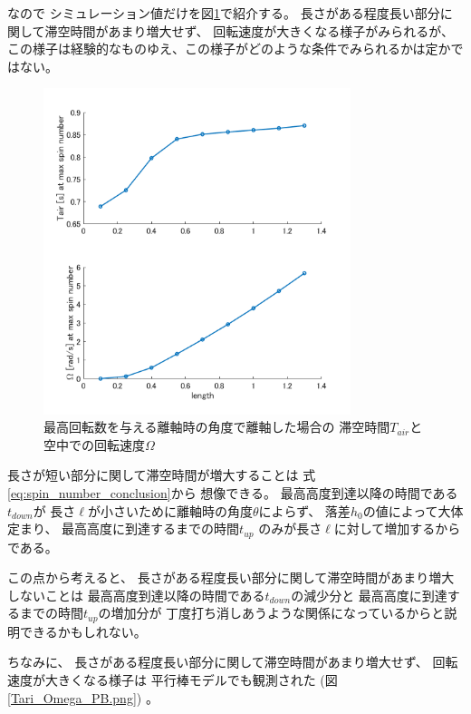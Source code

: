 \documentclass[a4paper,11pt]{jsarticle}
\begin{document}
なので
シミュレーション値だけを図\ref{Tair_Omega_at_maxspin.png}で紹介する。
長さがある程度長い部分に関して滞空時間があまり増大せず、
回転速度が大きくなる様子がみられるが、
この様子は経験的なものゆえ、この様子がどのような条件でみられるかは定かではない。

\begin{figure}[h]
  \centering
  \includegraphics[width = 0.8\textwidth]{Tair_Omega_at_maxspin.png}
  \caption{
    最高回転数を与える離軸時の角度で離軸した場合の
    滞空時間$T_{air}$と
    空中での回転速度$\Omega$
  }
  \label{Tair_Omega_at_maxspin.png}
\end{figure}

長さが短い部分に関して滞空時間が増大することは
式\ref{eq:spin_number_conclusion}から
想像できる。
最高高度到達以降の時間である$t_{down}$が
長さ$\ell$が小さいために離軸時の角度$\theta$によらず、
落差$h_0$の値によって大体定まり、
最高高度に到達するまでの時間$t_{up}$
のみが長さ$\ell$に対して増加するからである。

この点から考えると、
長さがある程度長い部分に関して滞空時間があまり増大しないことは
最高高度到達以降の時間である$t_{down}$の減少分と
最高高度に到達するまでの時間$t_{up}$の増加分が
丁度打ち消しあうような関係になっているからと説明できるかもしれない。

ちなみに、
長さがある程度長い部分に関して滞空時間があまり増大せず、
回転速度が大きくなる様子は
平行棒モデルでも観測された
(図\ref{Tari_Omega_PB.png})
。
\end{document}

